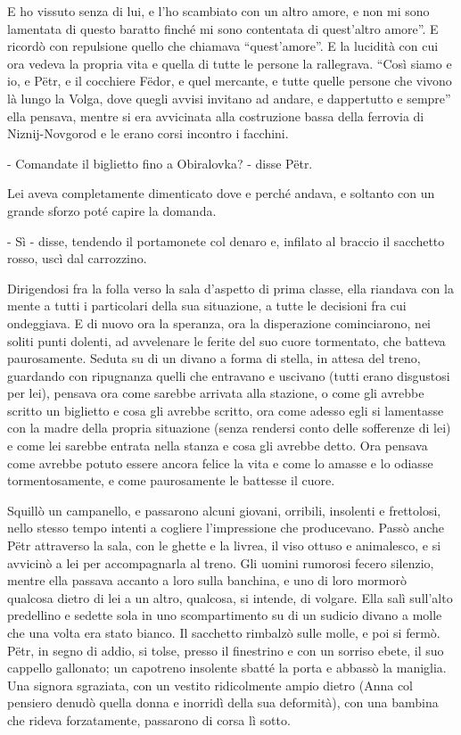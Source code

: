 E ho vissuto senza di lui, e l'ho scambiato con un altro amore, e non mi sono lamentata di questo baratto finché mi sono contentata di quest'altro amore''. E ricordò con repulsione quello che chiamava ``quest'amore''. E la lucidità con cui ora vedeva la propria vita e quella di tutte le persone la rallegrava. ``Così siamo e io, e Pëtr, e il cocchiere Fëdor, e quel mercante, e tutte quelle persone che vivono là lungo la Volga, dove quegli avvisi invitano ad andare, e dappertutto e sempre'' ella pensava, mentre si era avvicinata alla costruzione bassa della ferrovia di Niznij-Novgorod e le erano corsi incontro i facchini. 

- Comandate il biglietto fino a Obiralovka? - disse Pëtr. 

Lei aveva completamente dimenticato dove e perché andava, e soltanto con un grande sforzo poté capire la domanda. 

- Sì - disse, tendendo il portamonete col denaro e, infilato al braccio il sacchetto rosso, uscì dal carrozzino. 

Dirigendosi fra la folla verso la sala d'aspetto di prima classe, ella riandava con la mente a tutti i particolari della sua situazione, a tutte le decisioni fra cui ondeggiava. E di nuovo ora la speranza, ora la disperazione cominciarono, nei soliti punti dolenti, ad avvelenare le ferite del suo cuore tormentato, che batteva paurosamente. Seduta su di un divano a forma di stella, in attesa del treno, guardando con ripugnanza quelli che entravano e uscivano (tutti erano disgustosi per lei), pensava ora come sarebbe arrivata alla stazione, o come gli avrebbe scritto un biglietto e cosa gli avrebbe scritto, ora come adesso egli si lamentasse con la madre della propria situazione (senza rendersi conto delle sofferenze di lei) e come lei sarebbe entrata nella stanza e cosa gli avrebbe detto. Ora pensava come avrebbe potuto essere ancora felice la vita e come lo amasse e lo odiasse tormentosamente, e come paurosamente le battesse il cuore. 

\label{xxxi-5} 

Squillò un campanello, e passarono alcuni giovani, orribili, insolenti e frettolosi, nello stesso tempo intenti a cogliere l'impressione che producevano. Passò anche Pëtr attraverso la sala, con le ghette e la livrea, il viso ottuso e animalesco, e si avvicinò a lei per accompagnarla al treno. Gli uomini rumorosi fecero silenzio, mentre ella passava accanto a loro sulla banchina, e uno di loro mormorò qualcosa dietro di lei a un altro, qualcosa, si intende, di volgare. Ella salì sull'alto predellino e sedette sola in uno scompartimento su di un sudicio divano a molle che una volta era stato bianco. Il sacchetto rimbalzò sulle molle, e poi si fermò. Pëtr, in segno di addio, si tolse, presso il finestrino e con un sorriso ebete, il suo cappello gallonato; un capotreno insolente sbatté la porta e abbassò la maniglia. Una signora sgraziata, con un vestito ridicolmente ampio dietro (Anna col pensiero denudò quella donna e inorridì della sua deformità), con una bambina che rideva forzatamente, passarono di corsa lì sotto. 

